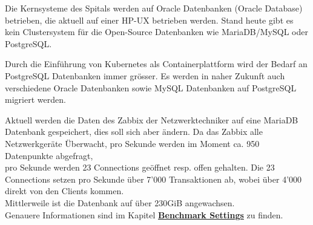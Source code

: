 \begin{flushleft}
    Die Kernsysteme des Spitals werden auf Oracle Datenbanken (\Gls{Oracle Database}) betrieben, die aktuell auf einer \Gls{HP-UX} betrieben werden.
    Stand heute gibt es kein Clustersystem für die Open-Source Datenbanken wie \Gls{MariaDB}/\Gls{MySQL} oder \Gls{PostgreSQL}\@.
\end{flushleft}
\begin{flushleft}
    Durch die Einführung von \Gls{Kubernetes} als Containerplattform wird der Bedarf an \Gls{PostgreSQL} Datenbanken immer grösser.
    Es werden in naher Zukunft auch verschiedene Oracle Datenbanken sowie \Gls{MySQL} Datenbanken auf \Gls{PostgreSQL} migriert werden.
\end{flushleft}
\begin{flushleft}
    Aktuell werden die Daten des \Gls{Zabbix} der Netzwerktechniker auf eine \Gls{MariaDB} Datenbank gespeichert, dies soll sich aber ändern.
    Da das \Gls{Zabbix} alle Netzwerkgeräte Überwacht, pro Sekunde werden im Moment ca. 950 Datenpunkte abgefragt,\\pro Sekunde werden 23 Connections geöffnet resp. offen gehalten.
    Die 23 Connections setzen pro Sekunde über 7'000 Transaktionen ab, wobei über 4'000 direkt von den Clients kommen.\\
    Mittlerweile ist die Datenbank auf über 230GiB angewachsen.\\
    Genauere Informationen sind im Kapitel \hyperref[subsubsec:benchmark_settings]{\textbf{Benchmark Settings}} zu finden.
\end{flushleft}
